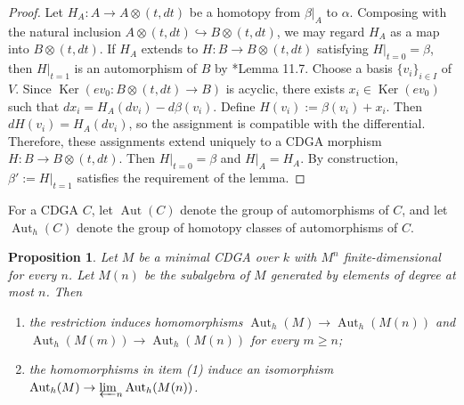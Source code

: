 \documentclass[11pt]{amsart}
\newtheorem{proposition}[theorem]{Proposition}
\theoremstyle{definition}
\numberwithin{equation}{section}
\numberwithin{equation}{section}
\DeclareMathOperator{\Aut}{Aut}
\DeclareMathOperator{\Ker}{Ker}
\begin{document}
\begin{proof}
Let $H_A:A\rightarrow A\otimes (t,dt)$ be a homotopy from $\beta\vert_{A}$ to $\alpha$. Composing with the natural inclusion $A\otimes (t,dt)\hookrightarrow B\otimes (t,dt)$, we may regard $H_A$ as a map into $B\otimes (t,dt)$. If $H_A$ extends to $H:B\rightarrow B\otimes (t,dt)$ satisfying $H{\vert}_{t=0}=\beta$, then $H\vert_{t=1}$ is an automorphism of $B$ by \cite{MGriffiths-Morgan-rational-homotopy}*{Lemma 11.7}. Choose a basis $\{v_i\}_{i\in I}$ of $V$. Since  $\Ker(ev_0:B\otimes (t,dt)\rightarrow B)$ is acyclic, there exists $x_i\in \Ker(ev_0)$ such that $dx_i=H_A(dv_i)-d\beta(v_i)$. Define $H(v_i):=\beta(v_i)+x_i$. Then $dH(v_i)=H_A(dv_i)$, so the assignment is compatible with the differential. Therefore, these assignments extend uniquely to a CDGA morphism $H:B\rightarrow B\otimes (t,dt)$. Then $H\vert_{t=0}=\beta$ and $H\vert_{A}=H_A$. By construction, $\beta':=H\vert_{t=1}$ satisfies the requirement of the lemma.
\end{proof}

For a CDGA $C$, let $\Aut(C)$ denote the group of automorphisms of $C$, and let $\Aut_h(C)$ denote the group of homotopy classes of automorphisms of $C$.

\begin{proposition}\label{Prop: homotopy automorphism group of a minimal CDGA is the inverse limit of smaller pieces}
Let $M$ be a minimal CDGA over $k$ with $M^n$ finite-dimensional for every $n$. Let $M(n)$ be the subalgebra of $M$ generated by elements of degree at most $n$. Then 
\begin{enumerate}[leftmargin=0.25in]
    \item the restriction induces homomorphisms $\Aut_h(M)\rightarrow \Aut_h(M(n))$ and $\Aut_h(M(m))\rightarrow \Aut_h(M(n))$ for every $m\geq n$;
    \item the homomorphisms in item (1) induce an isomorphism $\Aut_h(M)\rightarrow \varprojlim_n \Aut_h(M(n))$.
\end{enumerate}
\end{proposition}
\end{document}
